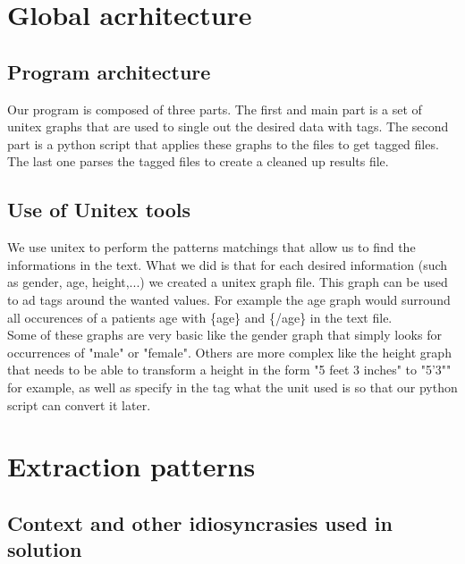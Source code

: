 \documentclass{eplDoc}
\begin{document}
\maketitle
\newpage

\section{Global acrhitecture}

\subsection{Program architecture}

Our program is composed of three parts. The first and main part is a set of unitex graphs that are used to single out the desired data with tags. The second part is a python script that applies these graphs to the files to get tagged files. The last one parses the tagged files to create a cleaned up results file. 

\subsection{Use of Unitex tools}

We use unitex to perform the patterns matchings that allow us to find the informations in the text. What we did is that for each desired information (such as gender, age, height,...) we created a unitex graph file. This graph can be used to ad tags around the wanted values. For example the age graph would surround all occurences of a patients age with \{age\} and \{/age\} in the text file. \\ 
Some of these graphs are very basic like the gender graph that simply looks for occurrences of "male" or "female". Others are more complex like the height graph that needs to be able to transform a height in the form "5 feet 3 inches" to "5'3"" for example, as well as specify in the tag what the unit used is so that our python script can convert it later. 

\section{Extraction patterns}

\subsection{Context and other idiosyncrasies used in solution}
\end{document}
